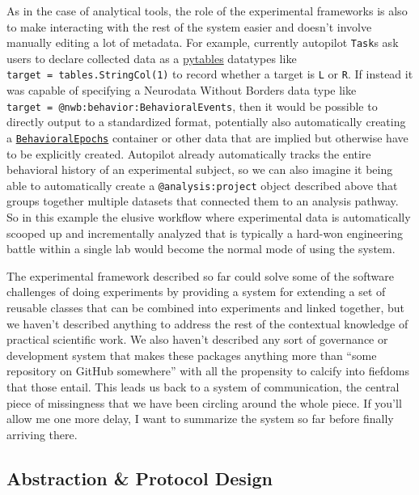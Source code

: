 \documentclass[notoc]{tufte-book}
\begin{document}
As in the case of analytical tools, the role of the experimental
frameworks is also to make interacting with the rest of the system
easier and doesn't involve manually editing a lot of metadata. For
example, currently autopilot \texttt{Task}s ask users to declare
collected data as a \href{https://www.pytables.org/}{pytables} \citep{altedPyTablesProcessingAnalyzing2003}  datatypes like
\texttt{target\ =\ tables.StringCol(1)} to record whether a target is
\texttt{\textquotesingle{}L\textquotesingle{}} or
\texttt{\textquotesingle{}R\textquotesingle{}}. If instead it was
capable of specifying a Neurodata Without Borders data type like
\texttt{target\ =\ \textquotesingle{}@nwb:behavior:BehavioralEvents\textquotesingle{}},
then it would be possible to directly output to a standardized format,
potentially also automatically creating a
\href{https://pynwb.readthedocs.io/en/stable/pynwb.behavior.html\#pynwb.behavior.BehavioralEpochs}{\texttt{BehavioralEpochs}}
container or other data that are implied but otherwise have to be
explicitly created. Autopilot already automatically tracks the entire
behavioral history of an experimental subject, so we can also imagine it
being able to automatically create a \texttt{@analysis:project} object
described above that groups together multiple datasets that connected
them to an analysis pathway. So in this example the elusive workflow
where experimental data is automatically scooped up and incrementally
analyzed that is typically a hard-won engineering battle within a single
lab would become the normal mode of using the system.

The experimental framework described so far could solve some of the
software challenges of doing experiments by providing a system for
extending a set of reusable classes that can be combined into
experiments and linked together, but we haven't described anything to
address the rest of the contextual knowledge of practical scientific
work. We also haven't described any sort of governance or development
system that makes these packages anything more than ``some repository on
GitHub somewhere'' with all the propensity to calcify into fiefdoms that
those entail. This leads us back to a system of communication, the
central piece of missingness that we have been circling around the whole
piece. If you'll allow me one more delay, I want to summarize the system
so far before finally arriving there.






\subsection{Abstraction \& Protocol
Design}
\end{document}

